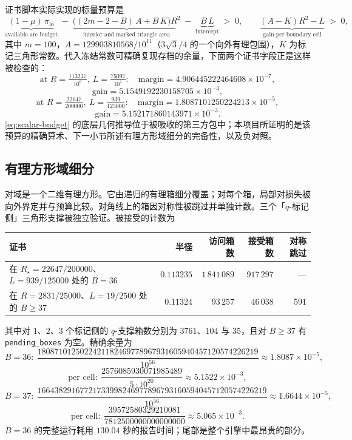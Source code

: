 证书脚本实际实现的标量预算是
\begin{equation}\label{eq:scalar-budget}
\underbrace{(1-\mu)\,\pi_{\mathrm{lo}}}_{\text{available arc budget}}
\;-\;\underbrace{\bigl((2m-2-B)\,A+B\,K\bigr)R^2}_{\text{interior and marked triangle area}}
\;-\;\underbrace{B\,L}_{\text{intercept}}\;>\;0,
\qquad
\underbrace{(A-K)R^2-L}_{\text{gain per boundary cell}}\;>\;0,
\end{equation}
其中 $m=100$，$A=129903810568/10^{11}$（$3\sqrt3/4$ 的一个向外有理包围），$K$ 为标记三角形常数。代入冻结常数可精确复现存档的余量，下面两个证书字段正是这样被检查的：
\[
\text{at }R=\tfrac{113237}{10^6},\ L=\tfrac{75097}{10^7}:\quad
\text{margin}=4.906445222464608\times10^{-7},
\]
\[
\text{gain}=5.1549192230158705\times10^{-3},
\]
\[
\text{at }R=\tfrac{22647}{200000},\ L=\tfrac{939}{125000}:\quad
\text{margin}=1.8087101250224213\times10^{-5},
\]
\[
\text{gain}=5.152171860143971\times10^{-3}.
\]
\eqref{eq:scalar-budget} 的底层几何推导位于被吸收的第三方包中；本项目所证明的是该预算的精确算术、下一小节所述有理方形域细分的完备性，以及负对照。

\subsection{有理方形域细分}

对域是一个二维有理方形。它由递归的有理箱细分覆盖；对每个箱，局部对损失被向外界定并与预算比较。对角线上的箱因对称性被跳过并单独计数。三个「$q$-标记侧」三角形支撑被独立验证。被接受的计数为

\begin{center}
\footnotesize
\begin{tabular}{@{}lrrrr@{}}
\toprule
证书 & 半径 & 访问箱数 & 接受箱数 & 对称跳过 \\
\midrule
在 $R_\star=22647/200000$、$L=939/125000$ 处的 $B=36$ & $0.113235$ & $1\,841\,089$ & $917\,297$ & --- \\
在 $R=2831/25000$、$L=19/2500$ 处的 $B\ge37$ & $0.11324$ & $93\,257$ & $46\,038$ & $591$ \\
\bottomrule
\end{tabular}
\end{center}

其中对 $1$、$2$、$3$ 个标记侧的 $q$-支撑箱数分别为 $3761$、$104$ 与 $35$，且对 $B\ge37$ 有 \texttt{pending\_\allowbreak{}boxes} 为空。精确余量为
\[
B=36:\ \frac{1808710125022421182469778967931605940457120574226219}{10^{56}}
\approx1.8087\times10^{-5},
\]
\[
\text{per cell}:\ \frac{2576085930071985489}{5\cdot10^{20}}\approx5.1522\times10^{-3},
\]
\[
B=37:\ \frac{166438291677217339982469778967931605940457120574226219}{10^{56}}
\approx1.6644\times10^{-5},
\]
\[
\text{per cell}:\ \frac{39572580329210081}{7812500000000000000}\approx5.065\times10^{-3}.
\]
$B=36$ 的完整运行耗用 $130.04$ 秒的报告时间；尾部是整个引擎中最昂贵的部分。

